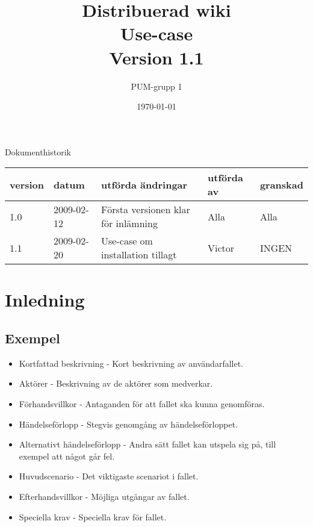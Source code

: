 

\ifpdf
\else
\fi

\title{Distribuerad wiki \\ Use-case \\ Version 1.1}
\author{PUM-grupp 1}
\date{\today}



\maketitle\thispagestyle{empty}

\newpage

{\centering \Large{Dokumenthistorik\\}}

\vspace{10pt}
\begin{tabularx}{\textwidth}{ |l|l|X|l|l| }
  \hline
    \textbf{version} & \textbf{datum} & \textbf{utförda ändringar} & \textbf{utförda av} & \textbf{granskad} \\
	\hline 
  1.0 & 2009-02-12 &  Första versionen klar för inlämning  & Alla & Alla   \\
	\hline  
  1.1 & 2009-02-20 & Use-case om installation tillagt & Victor & INGEN \\
  \hline
\end{tabularx}

\newpage
\setcounter{tocdepth}{3}
\tableofcontents
\newpage

\section{Inledning}


\subsection{Exempel}
\begin{itemize}
	\item Kortfattad beskrivning - Kort beskrivning av användarfallet.
	\item Aktörer - Beskrivning av de aktörer som medverkar.
	\item Förhandsvillkor - Antaganden för att fallet ska kunna genomföras.
	\item Händelseförlopp - Stegvis genomgång av händelseförloppet.
	\item Alternativt händelseförlopp - Andra sätt fallet kan utspela sig på, till exempel att något går fel.
	\item Huvudscenario - Det viktigaste scenariot i fallet.
	\item Efterhandsvillkor - Möjliga utgångar av fallet.
	\item Speciella krav - Speciella krav för fallet.
\end{itemize}

